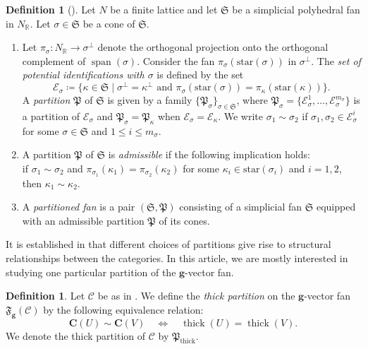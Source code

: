 \documentclass[10pt,twoside, a4paper,reqno]{amsart}
\DeclareMathOperator{\thick}{thick}
\DeclareMathOperator{\spann}{span}
\newcommand{\sth}{\;\vert\;}
\newcommand{\partfan}[1]{\mathfrak{F}_{\bfg}(#1)}
\newcommand{\Pfrak}{\mathfrak{P}}
\newcommand{\R}{\mathbb{R}}
\newcommand{\calC}{\mathcal{C}}
\newcommand{\boldC}{\mathbf{C}}
\newcommand{\bfg}{\mathbf{g}}
\newcommand{\Sfan}{\mathfrak{S}}
\theoremstyle{definition}
\newtheorem{definition}[theorem]{Definition}
\begin{document}
\begin{definition}[{\cite[§3]{Kai23}}]\label{def:admisspart}
Let $N$ be a finite lattice and let $\Sfan$ be a simplicial polyhedral fan in $N_{\R}$. Let $\sigma \in \Sfan$ be a cone of $\Sfan$. 
    \begin{enumerate}
    \item\label{def:admisspart_1} Let $\pi_{\sigma}\colon N_\R \to \sigma^{\perp}$ denote the orthogonal projection onto the orthogonal complement of $\spann(\sigma)$. Consider the fan $\pi_{\sigma}(\mathrm{star}(\sigma))$ in $\sigma^{\perp}$. The \textit{set of potential identifications with $\sigma$} is defined by the set
  \begin{equation*}
 	 \mathcal{E}_{\sigma} \coloneqq \{\kappa \in \Sfan \sth \sigma^{\perp} = {\kappa}^{\perp} \text{ and } \pi_{\sigma}(\mathrm{star}(\sigma)) = \pi_{{\kappa}}(\mathrm{star}({\kappa})) \}.
 \end{equation*}
A \textit{partition} $\mathfrak{P}$ of $\Sfan$ is given by a family $\{\mathfrak{P}_{\sigma}\}_{\sigma \in \Sfan}$, where $\mathfrak{P}_{\sigma}=\{\mathcal{E}^1_{\sigma},\dots, \mathcal{E}^{m_\sigma}_{\sigma} \}$ is a partition of $\mathcal{E}_{\sigma}$ and $\Pfrak_{\sigma}= \Pfrak_{\kappa}$ when $\mathcal{E}_{\sigma}= \mathcal{E}_{\kappa}$. We write $\sigma_1 \sim \sigma_2$ if $\sigma_1,\sigma_2\in \mathcal{E}^{i}_{\sigma}$ for some $\sigma\in \Sfan$ and $1\leq i\leq m_\sigma$.
    \item A partition $\mathfrak{P}$ of $\Sfan$ is \textit{admissible} if the following implication holds: \\
if $\sigma_1\sim \sigma_2$ and $\pi_{\sigma_1}(\kappa_1) = \pi_{\sigma_2}(\kappa_2)$ for some $\kappa_i \in \mathrm{star}(\sigma_i)$ and $i=1,2$, then $\kappa_1 \sim \kappa_2$.
\item A \textit{partitioned fan} {is a pair $(\Sfan, \mathfrak{P})$ consisting of} a simplicial fan {$\Sfan$} equipped with an admissible partition $\mathfrak{P}$ of its cones. 
\end{enumerate}
\end{definition}

It is established in \cite[§5]{Kai23} that different choices of partitions give rise to structural relationships between the categories. In this article, we are mostly interested in studying one particular partition of the $\bfg$-vector fan.

\begin{definition}\label{def:partitionbythick}
    Let $\calC$ be as in .
    We define the \textit{thick partition} on the $\bfg$-vector fan $\partfan{\calC}$ by the following equivalence relation:
    \[ \boldC(U) \sim \boldC(V) \quad \Longleftrightarrow \quad \thick(U) = \thick(V).\]
   We denote the thick partition of $\calC$ by $\mathfrak{P}_{\thick}$.
\end{definition}
\end{document}

